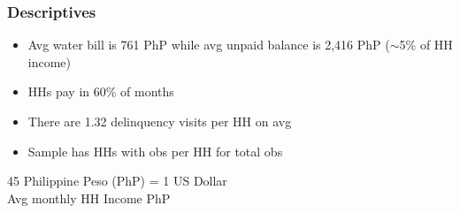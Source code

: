 \documentclass[aspectratio=149]{beamer}
\newcommand\Wider[2][3em]{%
\makebox[\linewidth][c]{%
  \begin{minipage}{\dimexpr\textwidth+#1\relax}
  \raggedright#2
  \end{minipage}%
  }%
}
\begin{document}
\begin{frame}
\frametitle{Descriptives}

% 

% 

\begin{itemize}
\item Avg water bill is 761 PhP while avg unpaid balance is 2,416 PhP ($\sim$5\% of HH income)
\vspace{.8mm}
\item HHs pay in 60\% of months
\vspace{.8mm}
\item There are 1.32 delinquency visits per HH on avg
\vspace{.8mm}
\item Sample has HHs with obs per HH for total obs 
\end{itemize}

\vspace{3mm}
45 Philippine Peso (PhP) = 1 US Dollar \\
Avg monthly HH Income PhP \\

\end{frame}
\end{document}

